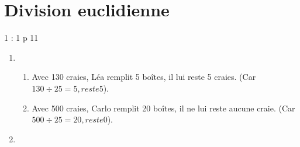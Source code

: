 \documentclass[12pt,a4paper]{article}
\date{}
\title{}
\begin{document}




\section{Division euclidienne}

\begin{myact}{1 : 1 p 11}
	\begin{enumerate}
		\item  
		\begin{enumerate}[label=\alph*. ]
			\item Avec 130 craies, Léa remplit 5 boîtes, il lui reste 5 craies. (Car $130 \div 25 = 5, reste 5$).
			\item Avec 500 craies, Carlo remplit 20 boîtes, il ne lui reste aucune craie. (Car $500 \div 25 = 20, reste 0$).
		\end{enumerate}
		
		\item 
		
	\end{enumerate}
\end{myact}
\end{document}
